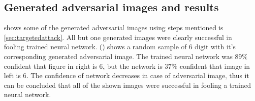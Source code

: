     \subsection{Generated adversarial images and results}

         shows some of the generated adversarial images using steps mentioned is \cref{sec:targetedattack}. All but one generated images were clearly successful in fooling trained neural network.  () shows a random sample of $6$ digit with it's corresponding generated adversarial image. The trained neural network was $89\%$ confident that figure in right is $6$, but the network is $37\%$ confident that image in left is $6$. The confidence of network decreases in case of adversarial image, thus it can be concluded that all of the shown images were successful in fooling a trained neural network. 

